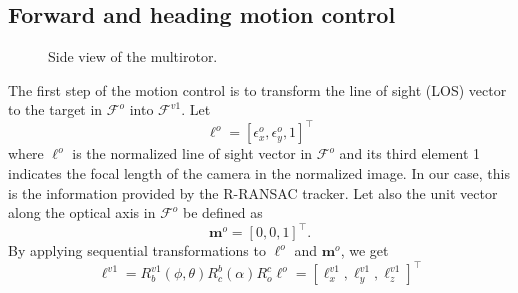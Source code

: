 \documentclass[letterpaper, 10 pt, conference]{ieeeconf}  %
\begin{document}
\subsection{Forward and heading motion control}
\begin{figure}[thpb]
	\centering
	\caption{Side view of the multirotor.}
	\label{side_view}
\end{figure}
The first step of the motion control is to transform the line of sight (LOS) vector to the target in $\mathcal{F}^o$ into $\mathcal{F}^{v1}$. Let 
\begin{equation}
\mathbf{\ell}^o=[\epsilon_x^o, \epsilon_y^o, 1]^\top
\end{equation} where $\ell^o$ is the normalized line of sight vector in $\mathcal{F}^o$ and its third element 1 indicates the focal length of the camera in the normalized image. In our case, this is the information provided by the R-RANSAC tracker. Let also the unit vector along the optical axis in $\mathcal{F}^o$ be defined as 
\begin{equation}
\mathbf{m}^o=[0, 0, 1]^\top.
\end{equation}
By applying sequential transformations to $\ell^o$ and $\mathbf{m}^o$, we get
\begin{equation}
\mathbf{\ell}^{v1}=R^{v1}_b(\phi,\theta)R^b_c(\alpha)R^c_o\ell^o=[\ell^{v1}_x, \ell^{v1}_y, \ell^{v1}_z]^\top
\end{equation}
\end{document}
